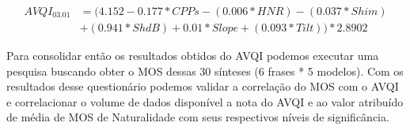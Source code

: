 \documentclass{article}
\begin{document}
\begin{equation}
	\begin{split}
    	AVQI_{03.01}& = (4.152 - 0.177*CPPs - (0.006*HNR) - (0.037*Shim)\\ 
    	&+ (0.941*ShdB) + 0.01*Slope + (0.093*Tilt))*2.8902
	\end{split}
\end{equation}

Para consolidar então os resultados obtidos do AVQI podemos executar uma pesquisa buscando obter o MOS dessas 30 sínteses (6 frases * 5 modelos). Com os resultados desse questionário podemos validar a correlação do MOS com o AVQI e correlacionar o volume de dados disponível a nota do AVQI e ao valor atribuído de média de MOS de Naturalidade com seus respectivos níveis de significância.


  
  
\end{document}
